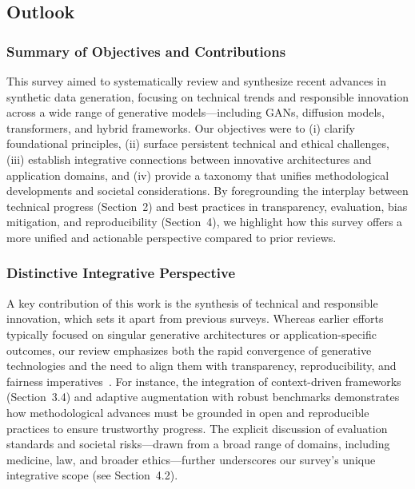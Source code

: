 \documentclass[sigconf]{acmart}
\begin{document}
\subsection{Outlook}

\subsubsection{Summary of Objectives and Contributions}
This survey aimed to systematically review and synthesize recent advances in synthetic data generation, focusing on technical trends and responsible innovation across a wide range of generative models---including GANs, diffusion models, transformers, and hybrid frameworks. Our objectives were to (i) clarify foundational principles, (ii) surface persistent technical and ethical challenges, (iii) establish integrative connections between innovative architectures and application domains, and (iv) provide a taxonomy that unifies methodological developments and societal considerations. By foregrounding the interplay between technical progress (Section~2) and best practices in transparency, evaluation, bias mitigation, and reproducibility (Section~4), we highlight how this survey offers a more unified and actionable perspective compared to prior reviews.

\subsubsection{Distinctive Integrative Perspective}
A key contribution of this work is the synthesis of technical and responsible innovation, which sets it apart from previous surveys. Whereas earlier efforts typically focused on singular generative architectures or application-specific outcomes, our review emphasizes both the rapid convergence of generative technologies and the need to align them with transparency, reproducibility, and fairness imperatives~\cite{ref74,ref75,ref97,ref102}. For instance, the integration of context-driven frameworks (Section~3.4) and adaptive augmentation with robust benchmarks demonstrates how methodological advances must be grounded in open and reproducible practices to ensure trustworthy progress. The explicit discussion of evaluation standards and societal risks---drawn from a broad range of domains, including medicine, law, and broader ethics---further underscores our survey's unique integrative scope (see Section~4.2).
\end{document}
